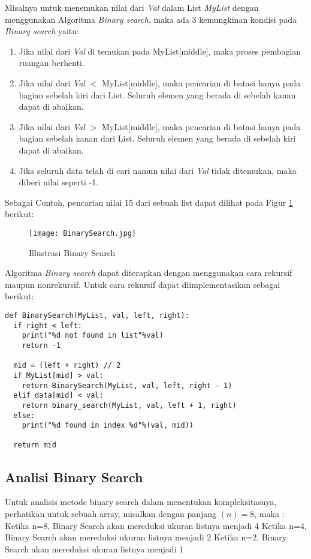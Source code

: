 \documentclass[12pt]{book}%
\begin{document}
 Misalnya untuk menemukan nilai dari \textit{Val}  dalam List \textit{MyList} dengan menggunakan Algoritma \textit{Binary search}, maka ada 3 kemungkinan kondisi pada \textit{Binary search} yaitu:
\begin{enumerate}
  \item Jika nilai dari \textit{Val} di temukan pada MyList[middle], maka proses pembagian ruangan berhenti. 
  \item Jika nilai dari \textit{Val} $<$ MyList[middle], maka pencarian di batasi hanya pada bagian sebelah kiri dari List. Seluruh elemen yang berada di sebelah kanan dapat di abaikan.
  \item Jika nilai dari \textit{Val} $>$ MyList[middle], maka pencarian di batasi hanya pada bagian sebelah kanan dari List. Seluruh elemen yang berada di sebelah kiri dapat di abaikan.
  \item Jika seluruh data telah di cari namun nilai dari \textit{Val} tidak ditemukan, maka diberi nilai seperti -1.
\end{enumerate}

Sebagai Contoh, pencarian nilai 15 dari sebuah list dapat dilihat pada Figur \ref{fig:Binary Search Ilustration} berikut:

\begin{figure}[htbp]
\begin{center}
	\texttt{[image: BinarySearch.jpg]}%
	\caption{Illustrasi Binary Search}%
	\label{fig:Binary Search Ilustration}%
\end{center}
\end{figure}

\newpage{}
Algoritma \textit{Binary search} dapat diterapkan dengan menggunakan cara rekursif maupun nonrekursif. Untuk cara rekursif dapat diimplementasikan sebagai berikut:

\lstset{language=Python}
\label{lst:BinarySearch}
\begin{lstlisting}[frame=single]
def BinarySearch(MyList, val, left, right):
  if right < left:
    print("%d not found in list"%val)
    return -1
	
  mid = (left + right) // 2
  if MyList[mid] > val:
    return BinarySearch(MyList, val, left, right - 1)
  elif data[mid] < val:
    return binary_search(MyList, val, left + 1, right)
  else:
    print("%d found in index %d"%(val, mid))
  
  return mid
\end{lstlisting}

\subsection{Analisi Binary Search}
Untuk analisis metode binary search dalam menentukan kompleksitasnya, perhatikan untuk sebuah array, misalkan dengan panjang $(n) = 8$, maka :\newline
Ketika n=8, Binary Search akan mereduksi ukuran listnya menjadi 4\newline
Ketika n=4, Binary Search akan mereduksi ukuran listnya menjadi 2\newline
Ketika n=2, Binary Search akan mereduksi ukuran listnya menjadi 1\newline
\end{document}
